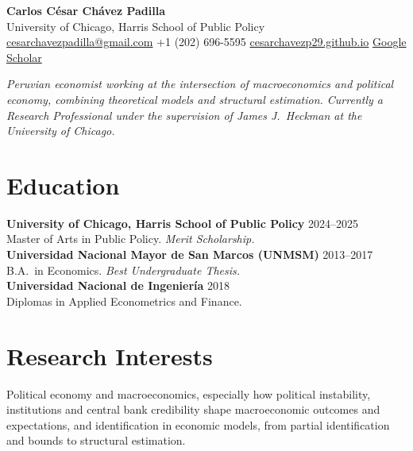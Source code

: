 \documentclass[11pt]{article}
\newcommand{\sep}{\;\textbar\;}
\begin{document}
\begin{center}
{\huge\bfseries\color{ink} Carlos César Chávez Padilla}\\[5pt]
University of Chicago, Harris School of Public Policy\\[3pt]
\href{mailto:cesarchavezpadilla@gmail.com}{cesarchavezpadilla@gmail.com} \sep +1 (202) 696-5595 \sep
\href{https://cesarchavezp29.github.io}{cesarchavezp29.github.io} \sep
\href{https://scholar.google.com/citations?user=LsVe9yQAAAAJ}{Google Scholar}
\end{center}

\vspace{2pt}
\textit{Peruvian economist working at the intersection of macroeconomics and political economy, combining theoretical models and structural estimation. Currently a Research Professional under the supervision of James J.\ Heckman at the University of Chicago.}

\section{Education}
\textbf{University of Chicago, Harris School of Public Policy} \hfill 2024--2025\\
Master of Arts in Public Policy. \textit{Merit Scholarship.}\\[3pt]
\textbf{Universidad Nacional Mayor de San Marcos (UNMSM)} \hfill 2013--2017\\
B.A.\ in Economics. \textit{Best Undergraduate Thesis.}\\[3pt]
\textbf{Universidad Nacional de Ingeniería} \hfill 2018\\
Diplomas in Applied Econometrics and Finance.

\section{Research Interests}
Political economy and macroeconomics, especially how political instability, institutions and central bank credibility shape macroeconomic outcomes and expectations, and identification in economic models, from partial identification and bounds to structural estimation.
\end{document}
